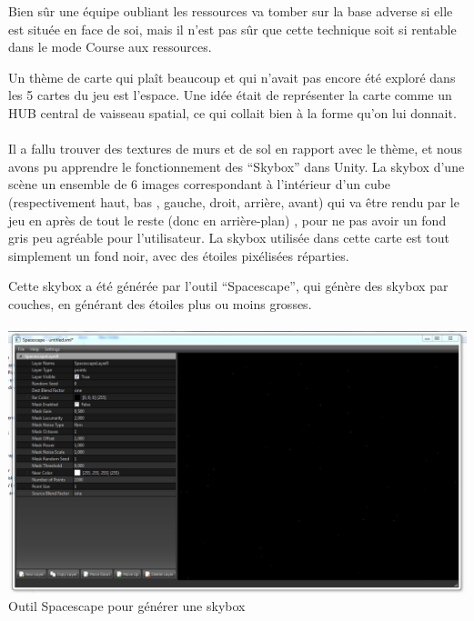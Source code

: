 \documentclass{report}
\begin{document}
Bien sûr une équipe oubliant les ressources va tomber sur la base adverse si elle est située en face de soi, mais il n’est pas sûr que cette technique soit si rentable dans le mode Course aux ressources.

Un thème de carte qui plaît beaucoup et qui n’avait pas encore été exploré dans les 5 cartes du jeu est l’espace. 
Une idée était de représenter la carte comme un HUB central de vaisseau spatial, ce qui collait bien à la forme qu’on lui donnait.
\paragraph{}
Il a fallu trouver des textures de murs et de sol en rapport avec le thème, et nous avons pu apprendre le fonctionnement des “Skybox” dans Unity.
La skybox d’une scène un ensemble de 6 images correspondant à l’intérieur d’un cube (respectivement haut, bas , gauche, droit, arrière, avant) qui va être rendu par le jeu en après de tout le reste (donc en arrière-plan) , pour ne pas avoir un fond gris peu agréable pour l’utilisateur.
La skybox utilisée dans cette carte est tout simplement un fond noir, avec des étoiles pixélisées réparties.

Cette skybox a été générée par l’outil “Spacescape”, qui génère des skybox par couches, en générant des étoiles plus ou moins grosses.

\paragraph{}
\begin{center}
\includegraphics[scale=0.5]{DATA/spacescape.png}
 {Outil Spacescape pour générer une skybox}
\end{center}
\paragraph{}
\end{document}
